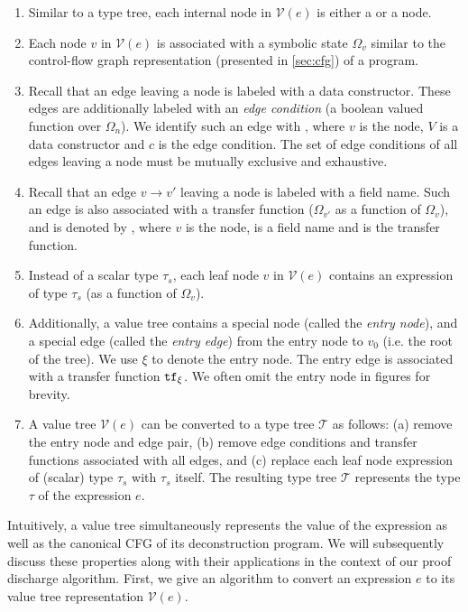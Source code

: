 \begin{enumerate}
\item Similar to a type tree, each internal node in $\mathcal{V}(e)$ is either a \sumn{} or a \prodn{} node.
\item Each node $v$ in $\mathcal{V}(e)$ is associated with a symbolic state $\Omega_v$
similar to the control-flow graph representation (presented in \cref{sec:cfg}) of a program.
\item Recall that an edge leaving a \sumn{} node is labeled with a data constructor.
These edges are additionally labeled with an {\em edge condition} (a boolean valued function over $\Omega_n$).
We identify such an edge with , where $v$ is the \sumn{} node,
$V$ is a data constructor and $c$ is the edge condition.
The set of edge conditions of all edges leaving a \sumn{} node must be mutually exclusive and exhaustive.
\item Recall that an edge $v \rightarrow v'$ leaving a \prodn{} node is labeled with a field name.
Such an edge is also associated with a transfer function ($\Omega_{v'}$ as a function of $\Omega_v$),
and is denoted by , where $v$ is the \prodn{} node,
 is a field name and \xfer{} is the transfer function.
\item Instead of a scalar type $\tau_s$, each leaf node $v$ in $\mathcal{V}(e)$ contains an expression
of type $\tau_s$ (as a function of $\Omega_{v}$).
\item Additionally, a value tree contains a special node (called the {\em entry node}), and a special edge
(called the {\em entry edge}) from the entry node to $v_0$ (i.e. the root of the tree).
We use $\xi$ to denote the entry node.
The entry edge is associated with a transfer function ${\tt tf}{}_\xi$.
We often omit the entry node in figures for brevity.
\item A value tree $\mathcal{V}(e)$ can be converted to a type tree $\mathcal{T}$ as follows:
(a) remove the entry node and edge pair, (b) remove edge conditions and transfer functions
associated with all edges, and (c) replace each leaf node expression of (scalar) type $\tau_s$
with $\tau_s$ itself.
The resulting type tree $\mathcal{T}$ represents the type $\tau$ of the expression $e$.
\end{enumerate}

Intuitively, a value tree simultaneously represents the value of the expression as well as
the canonical CFG of its deconstruction program.
We will subsequently discuss these properties along with their applications in the context
of our proof discharge algorithm.
First, we give an algorithm to convert an expression $e$ to its value tree representation $\mathcal{V}(e)$.

